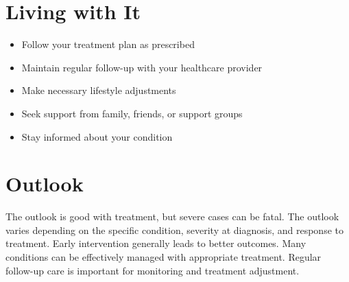 \section{Living with It}
\begin{itemize}[noitemsep]
  \item Follow your treatment plan as prescribed
  \item Maintain regular follow-up with your healthcare provider
  \item Make necessary lifestyle adjustments
  \item Seek support from family, friends, or support groups
  \item Stay informed about your condition
\end{itemize}
\section{Outlook}
The outlook is good with treatment, but severe cases can be fatal. The outlook varies depending on the specific condition, severity at diagnosis, and response to treatment. Early intervention generally leads to better outcomes. Many conditions can be effectively managed with appropriate treatment. Regular follow-up care is important for monitoring and treatment adjustment.
